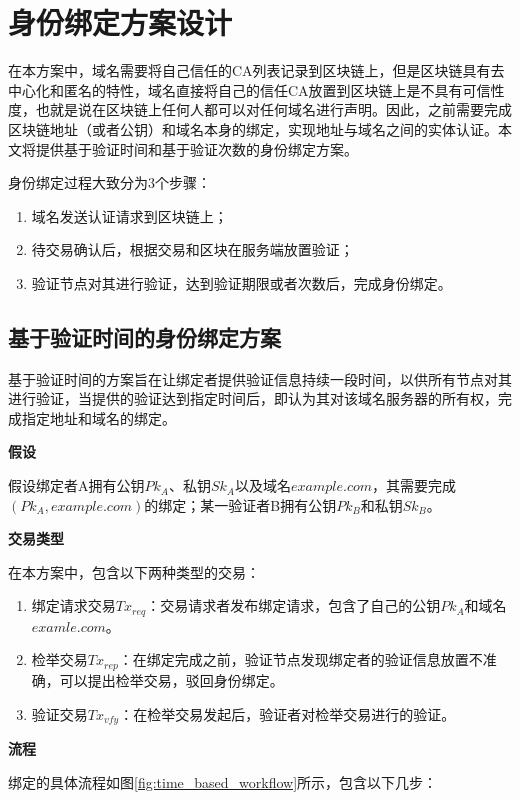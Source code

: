 \section{身份绑定方案设计}

在本方案中，域名需要将自己信任的CA列表记录到区块链上，但是区块链具有去中心化和匿名的特性，域名直接将自己的信任CA放置到区块链上是不具有可信性度，也就是说在区块链上任何人都可以对任何域名进行声明。因此，之前需要完成区块链地址（或者公钥）和域名本身的绑定，实现地址与域名之间的实体认证。本文将提供基于验证时间和基于验证次数的身份绑定方案。

身份绑定过程大致分为3个步骤：

\begin{enumerate}
	\item 域名发送认证请求到区块链上；
	\item 待交易确认后，根据交易和区块在服务端放置验证；
	\item 验证节点对其进行验证，达到验证期限或者次数后，完成身份绑定。
\end{enumerate}

\subsection{基于验证时间的身份绑定方案}

基于验证时间的方案旨在让绑定者提供验证信息持续一段时间，以供所有节点对其进行验证，当提供的验证达到指定时间后，即认为其对该域名服务器的所有权，完成指定地址和域名的绑定。


\noindent\textbf{假设}

假设绑定者A拥有公钥$Pk_A$、私钥$Sk_A$以及域名$example.com$，其需要完成$(Pk_A, example.com)$的绑定；某一验证者B拥有公钥$Pk_B$和私钥$Sk_B$。

\noindent\textbf{交易类型}

在本方案中，包含以下两种类型的交易：

\begin{enumerate}
	\item 绑定请求交易$Tx_{req}$：交易请求者发布绑定请求，包含了自己的公钥$Pk_A$和域名$examle.com$。
	\item 检举交易$Tx_{rep}$：在绑定完成之前，验证节点发现绑定者的验证信息放置不准确，可以提出检举交易，驳回身份绑定。
	\item 验证交易$Tx_{vfy}$：在检举交易发起后，验证者对检举交易进行的验证。
\end{enumerate}

\noindent\textbf{流程}

绑定的具体流程如图\ref{fig:time_based_workflow}所示，包含以下几步：

